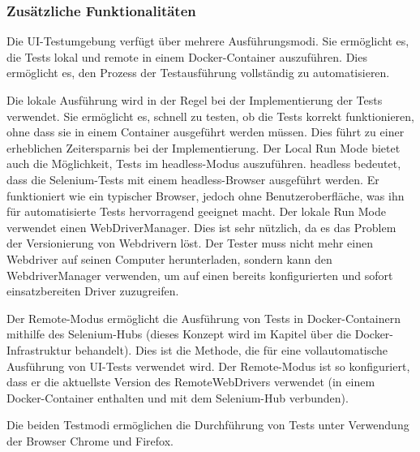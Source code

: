 \subsubsection{Zusätzliche Funktionalitäten}

Die UI-Testumgebung verfügt über mehrere Ausführungsmodi.
Sie ermöglicht es, die Tests lokal und remote in einem Docker-Container
auszuführen. Dies ermöglicht es, den Prozess der Testausführung 
vollständig zu automatisieren.


Die lokale Ausführung wird in der Regel bei der Implementierung
der Tests verwendet. Sie ermöglicht es, schnell zu testen, ob die
Tests korrekt funktionieren, ohne dass sie in einem Container
ausgeführt werden müssen. Dies führt zu einer erheblichen Zeitersparnis
bei der Implementierung. Der Local Run Mode bietet auch die
Möglichkeit, Tests im \gls{headless}-Modus auszuführen. \gls{headless} bedeutet,
dass die Selenium-Tests mit einem \gls{headless}-Browser ausgeführt werden.
Er funktioniert wie ein typischer Browser, jedoch ohne
Benutzeroberfläche, was ihn für automatisierte Tests hervorragend geeignet macht.
Der lokale Run Mode verwendet einen WebDriverManager. Dies ist sehr
nützlich, da es das Problem der Versionierung von Webdrivern löst.
Der Tester muss nicht mehr einen Webdriver auf seinen Computer
herunterladen, sondern kann den WebdriverManager verwenden, um
auf einen bereits konfigurierten und sofort einsatzbereiten Driver
zuzugreifen.

Der Remote-Modus ermöglicht die Ausführung von Tests in
Docker-Containern mithilfe des Selenium-Hubs (dieses Konzept wird
im Kapitel über die Docker-Infrastruktur behandelt). Dies ist die
Methode, die für eine vollautomatische Ausführung von UI-Tests
verwendet wird. Der Remote-Modus ist so konfiguriert, dass er die
aktuellste Version des RemoteWebDrivers verwendet (in einem
Docker-Container enthalten und mit dem Selenium-Hub verbunden).



Die beiden Testmodi ermöglichen die Durchführung von Tests unter
Verwendung der Browser Chrome und Firefox.